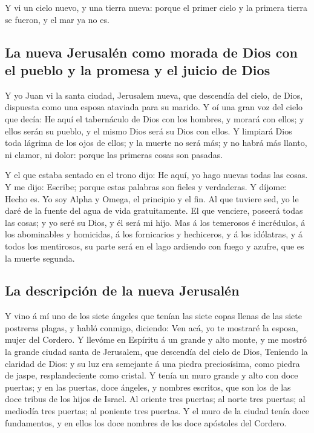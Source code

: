  Y vi un cielo nuevo, y una tierra nueva: porque el primer
cielo y la primera tierra se fueron, y el mar ya no es.

\hypertarget{la-nueva-jerusaluxe9n-como-morada-de-dios-con-el-pueblo-y-la-promesa-y-el-juicio-de-dios}{%
\subsection{La nueva Jerusalén como morada de Dios con el pueblo y la
promesa y el juicio de
Dios}\label{la-nueva-jerusaluxe9n-como-morada-de-dios-con-el-pueblo-y-la-promesa-y-el-juicio-de-dios}}

 Y yo Juan vi la santa ciudad, Jerusalem nueva, que
descendía del cielo, de Dios, dispuesta como una esposa ataviada para su
marido.  Y oí una gran voz del cielo que decía: He aquí el
tabernáculo de Dios con los hombres, y morará con ellos; y ellos serán
su pueblo, y el mismo Dios será su Dios con ellos.  Y
limpiará Dios toda lágrima de los ojos de ellos; y la muerte no será
más; y no habrá más llanto, ni clamor, ni dolor: porque las primeras
cosas son pasadas.

 Y el que estaba sentado en el trono dijo: He aquí, yo hago
nuevas todas las cosas. Y me dijo: Escribe; porque estas palabras son
fieles y verdaderas.  Y díjome: Hecho es. Yo soy Alpha y
Omega, el principio y el fin. Al que tuviere sed, yo le daré de la
fuente del agua de vida gratuitamente.  El que venciere,
poseerá todas las cosas; y yo seré su Dios, y él será mi hijo.
 Mas á los temerosos é incrédulos, á los abominables y
homicidas, á los fornicarios y hechiceros, y á los idólatras, y á todos
los mentirosos, su parte será en el lago ardiendo con fuego y azufre,
que es la muerte segunda.

\hypertarget{la-descripciuxf3n-de-la-nueva-jerusaluxe9n}{%
\subsection{La descripción de la nueva
Jerusalén}\label{la-descripciuxf3n-de-la-nueva-jerusaluxe9n}}

 Y vino á mí uno de los siete ángeles que tenían las siete
copas llenas de las siete postreras plagas, y habló conmigo, diciendo:
Ven acá, yo te mostraré la esposa, mujer del Cordero.  Y
llevóme en Espíritu á un grande y alto monte, y me mostró la grande
ciudad santa de Jerusalem, que descendía del cielo de Dios,
 Teniendo la claridad de Dios: y su luz era semejante á una
piedra preciosísima, como piedra de jaspe, resplandeciente como cristal.
 Y tenía un muro grande y alto con doce puertas; y en las
puertas, doce ángeles, y nombres escritos, que son los de las doce
tribus de los hijos de Israel.  Al oriente tres puertas; al
norte tres puertas; al mediodía tres puertas; al poniente tres puertas.
 Y el muro de la ciudad tenía doce fundamentos, y en ellos
los doce nombres de los doce apóstoles del Cordero.

